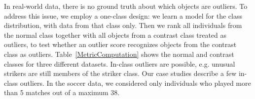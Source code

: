 \documentclass[conference]{IEEEtran}
\begin{document}
					In real-world data, there is no ground truth about which objects are outliers. To address this issue, we employ a one-class design: we learn a model for the class distribution, with data from that class only. Then we rank all individuals from the normal class together with all objects from a contrast class treated as outliers, to test whether an outlier score recognizes objects from the contrast class as outliers.
					Table~\ref{MetricComputation} shows the normal and contrast classes for three different datasets.  In-class outliers are possible, e.g. unusual strikers are still members of the striker class. Our case studies describe a few in-class outliers. In the soccer data, we considered only individuals who played more than 5 matches out of a maximum 38. 
%
					
					
\end{document}
